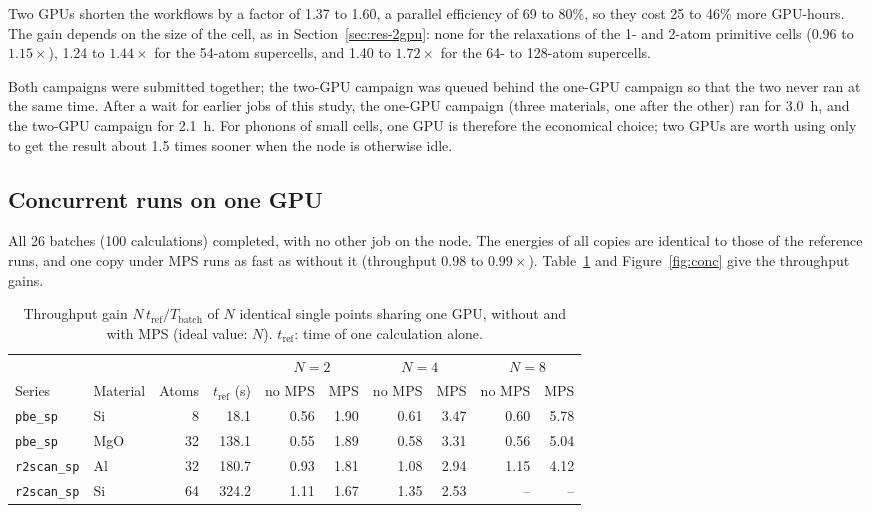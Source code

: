 \documentclass[11pt,letterpaper]{article}
\begin{document}
Two GPUs shorten the workflows by a factor of 1.37 to 1.60, a parallel efficiency of 69 to
80\%, so they cost 25 to 46\% more GPU-hours. The gain depends on the size of the cell, as in
Section~\ref{sec:res-2gpu}: none for the relaxations of the 1- and 2-atom primitive cells
(0.96 to $1.15\times$), 1.24 to $1.44\times$ for the 54-atom supercells, and 1.40 to
$1.72\times$ for the 64- to 128-atom supercells.

Both campaigns were submitted together; the two-GPU campaign was queued behind the one-GPU
campaign so that the two never ran at the same time. After a wait for earlier jobs of this study,
the one-GPU campaign (three materials, one after the other) ran for \SI{3.0}{h}, and the two-GPU
campaign for \SI{2.1}{h}. For phonons of small cells, one GPU is therefore the economical
choice; two GPUs are worth using only to get the result about 1.5 times sooner when the node is
otherwise idle.

\subsection{Concurrent runs on one GPU}
\label{sec:res-conc}
All 26 batches (100 calculations) completed, with no other job on the node. The energies of all
copies are identical to those of the reference runs, and one copy under MPS runs as fast as
without it (throughput 0.98 to $0.99\times$). Table~\ref{tab:conc} and
Figure~\ref{fig:conc} give the throughput gains.

\begin{table}[htbp]
\centering
\caption{Throughput gain $N\,t_\text{ref}/T_\text{batch}$ of $N$ identical single points
sharing one GPU, without and with MPS (ideal value: $N$). $t_\text{ref}$: time of one
calculation alone.}
\label{tab:conc}
\small
\begin{tabular}{@{}llrrrrrrrr@{}}
\toprule
 & & & & \multicolumn{2}{c}{$N=2$} & \multicolumn{2}{c}{$N=4$} & \multicolumn{2}{c}{$N=8$} \\
\cmidrule(lr){5-6}\cmidrule(lr){7-8}\cmidrule(l){9-10}
Series & Material & Atoms & $t_\text{ref}$ (s) & no MPS & MPS & no MPS & MPS & no MPS & MPS \\
\midrule
\texttt{pbe\_sp}    & Si  & 8  & 18.1  & 0.56 & 1.90 & 0.61 & 3.47 & 0.60 & 5.78 \\
\texttt{pbe\_sp}    & MgO & 32 & 138.1 & 0.55 & 1.89 & 0.58 & 3.31 & 0.56 & 5.04 \\
\texttt{r2scan\_sp} & Al  & 32 & 180.7 & 0.93 & 1.81 & 1.08 & 2.94 & 1.15 & 4.12 \\
\texttt{r2scan\_sp} & Si  & 64 & 324.2 & 1.11 & 1.67 & 1.35 & 2.53 & --   & --   \\
\bottomrule
\end{tabular}
\end{table}
\end{document}
